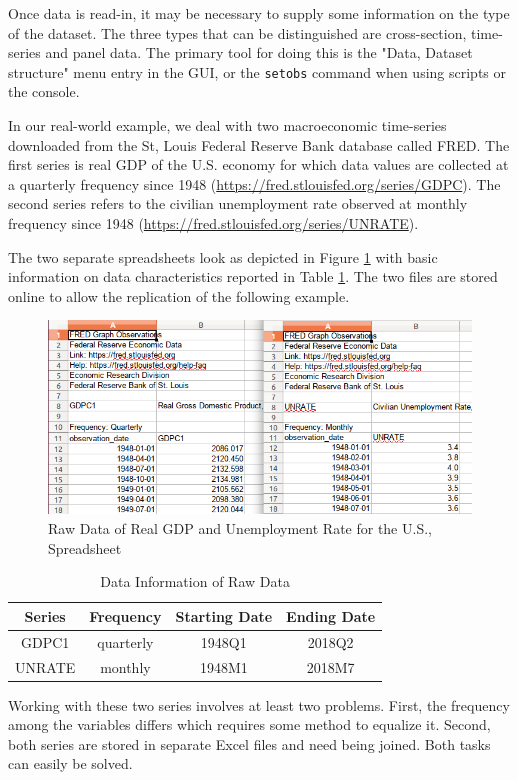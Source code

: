 \documentclass[11pt]{article}
\begin{document}
Once data is read-in, it may be necessary to supply some information on the type of the dataset. The three types that can be distinguished are cross-section, time-series and panel data. The primary tool for doing this is the "Data, Dataset structure" menu entry in the GUI, or the \texttt{setobs} command when using scripts or the console.

In our real-world example, we deal with two macroeconomic time-series downloaded from the St, Louis Federal Reserve Bank database called FRED. %
The first series is real GDP of the U.S. economy for which data values are collected at a quarterly frequency since 1948 (\url{https://fred.stlouisfed.org/series/GDPC}). The second series refers to the civilian unemployment rate observed at monthly frequency since 1948 (\url{https://fred.stlouisfed.org/series/UNRATE}).

The two separate spreadsheets look as depicted in Figure \ref{fig:spread} with basic information on data characteristics reported in Table \ref{tab:datainfo}. The two files are stored online to allow the replication of the following example.

\begin{figure}[!h]
	\centering
	\includegraphics[width=.6\textwidth]{../figures/data_spreadsheet}
	\caption{Raw Data of Real GDP and Unemployment Rate for the U.S., Spreadsheet}
	\label{fig:spread}
\end{figure}


\begin{table}[!h]
	\centering
	\footnotesize
	\begin{tabular}{cccc}
		\hline
		Series & Frequency & Starting Date & Ending Date \\ 
		\hline 
		GDPC1	& quarterly & 1948Q1 & 2018Q2 \\ 
		UNRATE	& monthly & 1948M1 & 2018M7 \\ 
		\hline 
	\end{tabular}
	\caption{Data Information of Raw Data}
	\label{tab:datainfo}
\end{table}

Working with these two series involves at least two problems. First, the frequency among the variables differs which requires some method to equalize it. %
Second, both series are stored in separate Excel files and need being joined. Both tasks can easily be solved.
\end{document}
